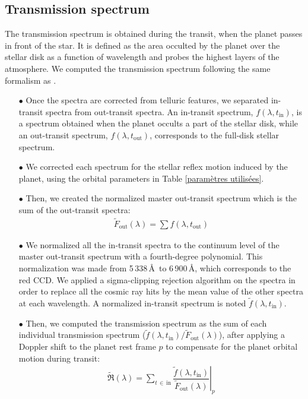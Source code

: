 \documentclass{aa}
\begin{document}
	\subsection{Transmission spectrum}
The transmission spectrum \citep{seager_theoretical_2000,brown_transmission_2001} is obtained during the transit, when the planet passes in front of the star. It is defined as the area occulted by the planet over the stellar disk as a function of wavelength and probes the highest layers of the atmosphere.
We computed the transmission spectrum following the same formalism as  \cite{wyttenbach_hot_2017}.\\	
\begin{itemize}
\item[$\bullet$]Once the spectra are corrected from telluric features, we separated in-transit spectra from out-transit spectra. An in-transit spectrum, $f(\lambda,t_\mathrm{in})$, is a spectrum obtained when the planet occults a part of the stellar disk, while an out-transit spectrum, $f(\lambda,t_\mathrm{out})$, corresponds to the full-disk stellar spectrum.
\item[$\bullet$] We corrected each spectrum for the stellar reflex motion induced by the planet, using the orbital parameters in Table \ref{paramètres utilisées}.
\item[$\bullet$]Then, we created the normalized master out-transit spectrum which is the sum of the out-transit spectra:
\begin{eqnarray}
\tilde{F}_{\mathrm{out}}(\lambda)=\sum f(\lambda,t_\mathrm{out})
\label{master out}
\end{eqnarray}
\item[$\bullet$] We normalized all the in-transit spectra to the continuum level of the master out-transit spectrum with a fourth-degree polynomial. This normalization was made from 5\,338\,\AA\ to 6\,900\,\AA, which corresponds to the red CCD. We applied a sigma-clipping rejection algorithm on the spectra in order to replace all the cosmic ray hits by the mean value of the other spectra at each wavelength. A normalized in-transit spectrum is noted $\tilde{f}(\lambda,t_\mathrm{in})$.\\
\item[$\bullet$]Then, we computed the transmission spectrum as the sum of each individual transmission spectrum ($\tilde{f}(\lambda,t_\mathrm{in})/\tilde{F}_{\mathrm{out}}(\lambda)$), after applying a Doppler shift to the planet rest frame $p$ to compensate for the planet orbital motion during transit:
\begin{eqnarray}
\tilde{\mathfrak{R}}(\lambda)=\sum_{t\,\in\,\mathrm{in}} \left. \dfrac{\tilde{f}(\lambda,t_\mathrm{in})}{\tilde{F}_\mathrm{out}(\lambda)}\right|_{p}
\label{TS basic flux}
\end{eqnarray}


\end{itemize}
\end{document}
